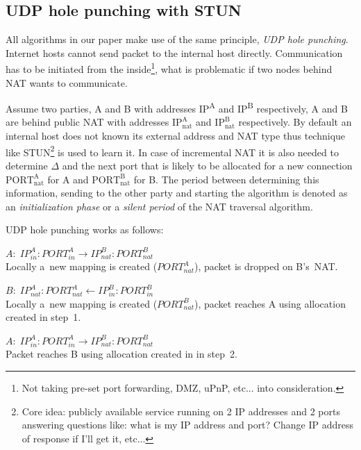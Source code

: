 \documentclass[twoside]{article}
\newcommand{\ignore}[1]{}
\begin{document}
\begin{multicols}{2}
\section{UDP hole punching with STUN}
All algorithms in our paper make use of the same principle, \emph{UDP hole punching}. 
Internet hosts cannot send packet to the internal host directly. 
Communication has to be initiated from the inside\footnote{Not taking
pre-set port forwarding, DMZ, uPnP, etc... into consideration. }, what is problematic if two nodes behind 
NAT wants to communicate.

Assume two parties, A and B with addresses IP\textsuperscript{A} and IP\textsuperscript{B} respectively,
A and B are behind public NAT with addresses $\text{IP}^{\text{A}}_{\text{nat}}$ and $\text{IP}^{\text{B}}_{\text{nat}}$
respectively. By default an internal host does not known its external address and NAT type thus technique like 
STUN\footnote{Core idea: publicly available service running on 2 IP addresses and 2 ports 
answering questions like: what is my IP address and port? Change IP address of response if I'll get it, etc...} 
is used to learn it. In case of incremental NAT it is also needed to determine $\Delta$ and the next port
that is likely to be allocated for a new connection $\text{PORT}^{\text{A}}_{\text{nat}}$ for A and $\text{PORT}^{\text{B}}_{\text{nat}}$
for B. The period between determining this information, sending to the other party and starting the algorithm is
denoted as an \emph{initialization phase} or a \emph{silent period}\ignore{\footnote{Since the algorithm itself does nothing.}} of the NAT traversal algorithm. 

UDP hole punching works as follows:\\
\begin{compactitem}
 \item [1.] $A: \; IP^A_{in}:PORT^A_{in} \longrightarrow IP^B_{nat}:PORT^B_{nat}$ \\
Locally a~new mapping is created ($PORT^A_{nat}$), packet is dropped on B's~NAT.
 \item [2.] $B: \; IP^A_{nat}:PORT^A_{nat} \longleftarrow  IP^B_{in}:PORT^B_{in}$ \\
Locally a~new mapping is created ($PORT^B_{nat}$), packet reaches A using allocation created in step~1.
 \item [3.] $A: \; IP^A_{in}:PORT^A_{in} \longrightarrow IP^B_{nat}:PORT^B_{nat}$ \\
Packet reaches B using allocation created in in step~2.
\end{compactitem}


\end{multicols}
\end{document}
